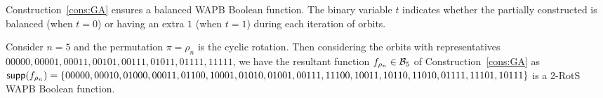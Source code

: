 \documentclass{llncs}
\begin{document}
Construction~\ref{cons:GA} ensures a balanced WAPB Boolean function. The binary variable $t$ indicates whether the partially constructed is balanced (when $t = 0$) or having an extra $1$ (when $t = 1$) during each iteration of orbits.
\begin{example}
Consider $n = 5$ and the permutation $\pi = \rho_n$ is the cyclic rotation. Then considering the orbits with representatives $00000, 00001, 00011, 00101, 00111, 01011, 01111, 11111$, we have the resultant function $f_{\rho_n} \in \mathcal{B}_{5}$ of Construction~\ref{cons:GA} as $\mathsf{supp}(f_{\rho_n}) = \{00000, 00010, 01000, 00011, 01100, 10001, 01010, 01001, 00111,\\ 11100, 10011, 10110, 11010, 01111, 11101, 10111\}$ is a 2-RotS WAPB Boolean function.
\end{example}
\end{document}
